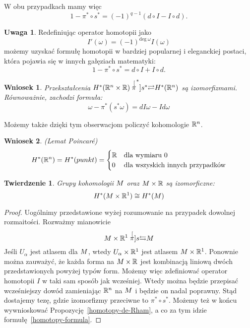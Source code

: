 \documentclass[licencjacka]{pracamgr}
\theoremstyle{definition}
\theoremstyle{definition}
\newtheorem{remark}{Uwaga}[section]
\theoremstyle{plain}
\theoremstyle{plain}
\theoremstyle{plain}
\newtheorem{theorem}{Twierdzenie}[section]
\theoremstyle{plain}
\theoremstyle{plain}
\newtheorem{wniosek}{Wniosek}[section]
\def\M{\ensuremath M}
\def\R{\ensuremath\mathbb{R}}
\begin{document}
W obu przypadkach mamy więc 
\[
1 - \pi^\ast \circ s^\ast = (-1)^{q-1}(d \circ I - I \circ d).
\] 

\begin{remark}
Redefiniując operator homotopii jako
\[
I'(\omega) = (-1)^{\text{deg}~\omega} I(\omega)
\]
możemy uzyskać formułę homotopii w bardziej popularnej i eleganckiej postaci,
która pojawia się w innych gałęziach matematyki:
\[
1 - \pi^\ast \circ s^\ast = d \circ I + I \circ d.
\]
\end{remark}

\begin{wniosek}\label{pi-is-isomorphism}
Przekształcenia $H^\ast (\R^n \times \R)
\stackrel[\pi^\ast]{s^\ast}{\rightleftarrows} H^\ast(\R^n)$ są izomorfizmami.
Równoważnie, zachodzi formuła:
\begin{equation}\label{homotopy-formula-pi}
    \omega - \pi^\ast( s^\ast \omega) = dI \omega - I d\omega
\end{equation}
\end{wniosek}


Możemy także dzięki tym obserwacjom policzyć kohomologie $\R^n$.
\begin{wniosek}(Lemat Poincaré)
\[
H^\ast(\R^n) = H^\ast(punkt) = 
\begin{cases}
\R & \text{dla wymiaru 0} \\
0 & \text{dla wszyskich innych przypadków} \\
\end{cases}
\]
\end{wniosek} 

\begin{theorem}
Grupy kohomologii $\M$ oraz $\M \times \R$ są izomorficzne:
\[
H^\ast( \M \times \R^1) \cong H^\ast( \M)
\]
\end{theorem}
\begin{proof}
Uogólnimy przedstawione wyżej rozumowanie na przypadek dowolnej
rozmaitości. Rozważmy mianowicie
\[
 \M \times \R^1 \stackrel[\pi]{s}{\leftrightarrows} \M
\]
Jeśli ${U_\alpha}$ jest atlasem dla $\M$, wtedy ${U_\alpha \times \R^1}$ jest
atlasem $\M \times \R^1$. Ponownie można zauważyć, że każda forma na $\M \times
\R$ jest kombinacją liniową dwóch przedstawionych powyżej typów form.  Możemy
więc zdefiniować operator homotopii $I$ w taki sam sposób jak wcześniej.  Wtedy
można będzie przepisać wcześniejszy dowód zamieniając $\R^n$ na $\M$ i będzie
on nadal poprawny.
 Stąd dostajemy tezę, gdzie izomorfizmy przeciwne to $\pi^\ast \circ
s^\ast$. Możemy też w końcu wywnioskować Propozycję~\ref{homotopy-de-Rham}, a co
za tym idzie formułę~\ref{homotopy-formula}.
\end{proof}
\end{document}

